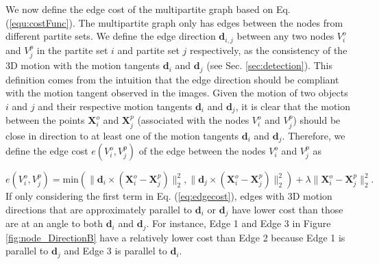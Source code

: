 We now define the edge cost of the multipartite graph based on Eq. (\ref{equ:costFunc}).
The multipartite graph only has edges between the nodes from different partite sets.
We define the edge direction $\mathbf{d}_{i,j}$ between any two nodes $V_i^o$ and $V_j^p$ in the partite set $i$ and partite set $j$ respectively, as the consistency of the 3D motion with the motion tangents $\mathbf d_i$ and $\mathbf d_j$ (see Sec. \ref{sec:detection}). This definition comes from the intuition that the edge direction should be compliant with the motion tangent observed in the images. Given the motion of two objects $i$ and $j$ and their respective motion tangents $\mathbf d_i$ and $\mathbf d_j$, it is clear that the motion between the points $\mathbf{X}_i^o$ and $\mathbf{X}_j^p$ (associated with the nodes $V_i^o$ and $V_j^p$) should be close in direction to at least one of the motion tangents $\mathbf d_i$ and $\mathbf d_j$.
Therefore, we define the edge cost $e(V_i^o,V_j^p)$ of the edge between the nodes $V_i^o$ and $V_j^p$ as

\begin{equation}
\label{eq:edgecost}
e(V_i^o,V_j^p)=\text{min}(\|\mathbf{d}_i\times(\mathbf{X}_i^{o}-\mathbf{X}_j^{p})\|_2^2, \|\mathbf{d}_j\times(\mathbf{X}_i^{o}-\mathbf{X}_j^{p})\|_2^2) +\lambda\|\mathbf{X}_i^{o}-\mathbf{X}_j^{p}\|_2^2.
\end{equation}
If only considering the first term in Eq. (\ref{eq:edgecost}), edges with 3D motion directions that are approximately parallel to $\mathbf{d}_i$ or $\mathbf{d}_j$ have lower  cost than those are at an angle to both $\mathbf{d}_i$ and $\mathbf{d}_j$. For instance, %
Edge 1 and Edge 3 in Figure \ref{fig:node_DirectionB} have a relatively lower cost than Edge 2 because Edge 1 is parallel to $\mathbf{d}_j$ and Edge 3 is parallel to $\mathbf{d}_i$.

